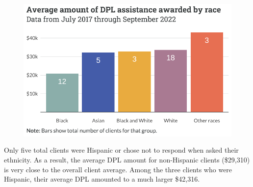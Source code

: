 \documentclass[
  letterpaper,
  DIV=11,
  numbers=noendperiod]{scrartcl}
\begin{document}
\begin{figure}[H]

{\centering \includegraphics{piedmont_files/figure-pdf/dpl-race-1.pdf}

}

\end{figure}

Only five total clients were Hispanic or chose not to respond when asked
their ethnicity. As a result, the average DPL amount for non-Hispanic
clients (\$29,310) is very close to the overall client average. Among
the three clients who were Hispanic, their average DPL amounted to a
much larger \$42,316.
\end{document}
